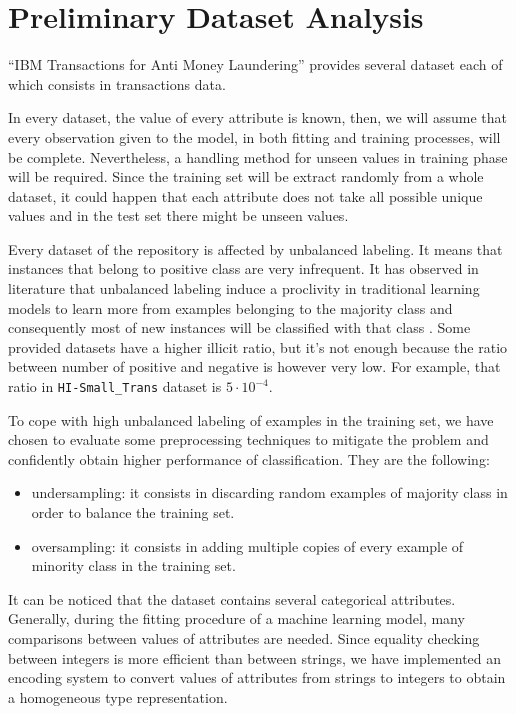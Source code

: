 \documentclass[12pt]{article}
\begin{document}
\section{Preliminary Dataset Analysis}

``IBM Transactions for Anti Money Laundering'' provides several dataset each of which consists in transactions data.

In every dataset, the value of every attribute is known, then, we will assume that every observation given to the model, in both fitting and training processes, will be complete.
Nevertheless, a handling method for unseen values in training phase will be required. Since the training set will be extract randomly from a whole dataset, it could happen that each attribute does not take all possible unique values and in the test set there might be unseen values.

Every dataset of the repository is affected by unbalanced labeling. It means that instances that belong to positive class are very infrequent.
It has observed in literature that unbalanced labeling induce a proclivity in traditional learning models to learn more from examples belonging to the majority class and consequently most of new instances will be classified with that class \cite{Ling2010, ClassImbalanceProblem}.
Some provided datasets have a higher illicit ratio, but it's not enough because the ratio between number of positive and negative is however very low.
For example, that ratio in \texttt{HI-Small\_Trans} dataset is $5 \cdot 10^{-4}$.

To cope with high unbalanced labeling of examples in the training set, we have chosen to evaluate some preprocessing techniques to mitigate the problem and confidently obtain higher performance of classification. They are the following:
%
\begin{itemize}
    \setlength\itemsep{0cm}
    \item undersampling: it consists in discarding random examples of majority class in order to balance the training set.
    \item oversampling: it consists in adding multiple copies of every example of minority class in the training set.
\end{itemize}
%

It can be noticed that the dataset contains several categorical attributes. Generally, during the fitting procedure of a machine learning model, many comparisons between values of attributes are needed. Since equality checking between integers is more efficient than between strings, we have implemented an encoding system to convert values of attributes from strings to integers to obtain a homogeneous type representation.
\end{document}
